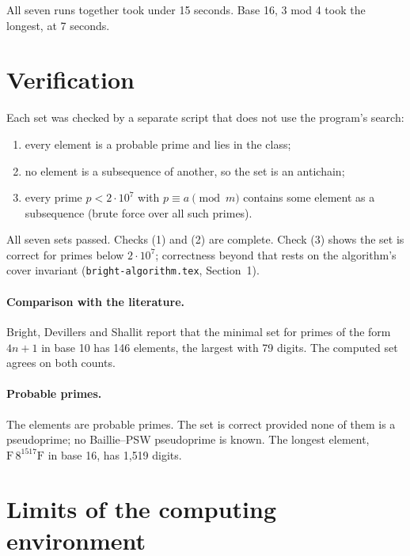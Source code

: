 \documentclass[11pt]{article}
\newcommand{\code}[1]{\texttt{#1}}
\begin{document}
All seven runs together took under 15 seconds. Base 16, 3 mod 4 took the longest, at 7 seconds.

\section{Verification}

Each set was checked by a separate script that does not use the program's search:
\begin{enumerate}[label=(\arabic*)]
\item every element is a probable prime and lies in the class;
\item no element is a subsequence of another, so the set is an antichain;
\item every prime $p < 2\cdot 10^7$ with $p\equiv a\pmod m$ contains some element as a subsequence (brute force over all such primes).
\end{enumerate}
All seven sets passed. Checks (1) and (2) are complete. Check (3) shows the set is correct for primes below $2\cdot10^7$; correctness beyond that rests on the algorithm's cover invariant (\code{bright-algorithm.tex}, Section~1).

\paragraph{Comparison with the literature.} Bright, Devillers and Shallit report that the minimal set for primes of the form $4n+1$ in base 10 has 146 elements, the largest with 79 digits. The computed set agrees on both counts.

\paragraph{Probable primes.} The elements are probable primes. The set is correct provided none of them is a pseudoprime; no Baillie--PSW pseudoprime is known. The longest element, $\mathrm{F}\,8^{1517}\mathrm{F}$ in base 16, has 1{,}519 digits.

\section{Limits of the computing environment}
\end{document}
